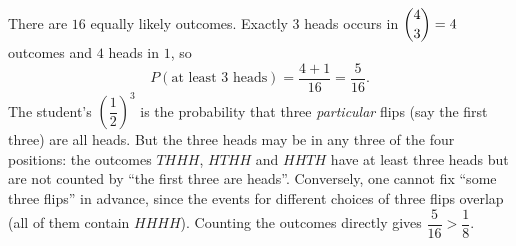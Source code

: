 There are $16$ equally likely outcomes. Exactly $3$ heads occurs in $\dbinom43=4$ outcomes and $4$ heads in $1$, so
\[
P(\text{at least }3\text{ heads})=\dfrac{4+1}{16}=\boxed{\dfrac{5}{16}}.
\]
The student's $\left(\dfrac{1}{2}\right)^3$ is the probability that three \emph{particular} flips (say the first three) are all heads. But the three heads may be in any three of the four positions: the outcomes $THHH$, $HTHH$ and $HHTH$ have at least three heads but are not counted by ``the first three are heads''. Conversely, one cannot fix ``some three flips'' in advance, since the events for different choices of three flips overlap (all of them contain $HHHH$). Counting the outcomes directly gives $\dfrac{5}{16}>\dfrac{1}{8}$.
